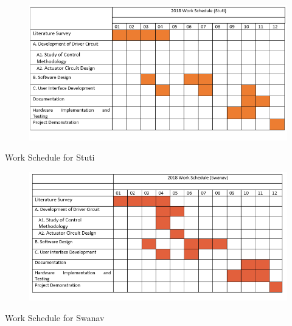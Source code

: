 			\begin{table}[H]
				\begin{figure}[H]
					\centering
					\includegraphics[width=\textwidth]{photos/gantt/StutiGC.png}
				\end{figure}
			\caption{Work Schedule for Stuti}
			\end{table}
			\begin{table}[H]
				\begin{figure}[H]
					\centering
					\includegraphics[width=\textwidth]{photos/gantt/SwanavGC.png}
				\end{figure}
				\caption{Work Schedule for Swanav}
			\end{table}
\newpage
